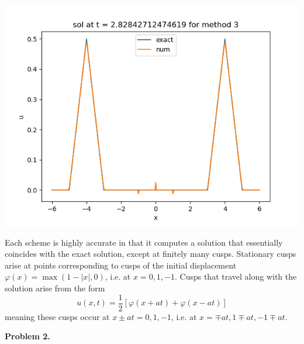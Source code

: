 \documentclass{article}
\def\tbf#1{\textbf{#1}}
\newcommand{\vp}{\varphi}
\begin{document}
\begin{enumerate}[label=(\alph*)]
\begin{center}
	\includegraphics[scale=.3]{hw11 sol n = 80 method 3}
\end{center}

Each scheme is highly accurate in that it computes a solution that essentially coincides with the exact solution, except at finitely many cusps. Stationary cusps arise at points corresponding to cusps of the initial displacement $\vp(x)=\max(1-|x|,0)$, i.e. at $x=0,1,-1$. Cusps that travel along with the solution arise from the form 
$$u(x,t) = \frac12[\vp(x+at)+\vp(x-at)]$$
meaning these cusps occur at $x\pm at=0,1,-1$, i.e. at $x=\mp at,1\mp at,-1\mp at$.
	
\end{enumerate}
\pagebreak



\tbf{Problem 2.}
\end{document}

